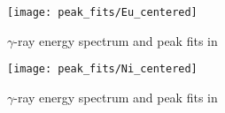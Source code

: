 \begin{figure}[htb]
\texttt{[image: peak\_fits/Eu\_centered]}
\caption{$\gamma$-ray energy spectrum and peak fits in \texttt{}
}
\label{fig:Eu_centered}
\end{figure}

\begin{figure}[htb]
\texttt{[image: peak\_fits/Ni\_centered]}
\caption{$\gamma$-ray energy spectrum and peak fits in \texttt{}
}
\label{fig:Ni_centered}
\end{figure}